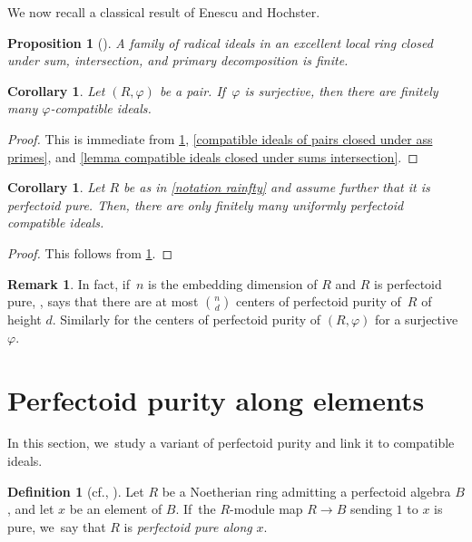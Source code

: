 \documentclass[11pt]{article}
\newcommand{\cf}{cf.\xspace}
\let\autoref\cref
\theoremstyle{plain}
\newtheorem{corollary}[theorem]{Corollary}
\newtheorem{proposition}[theorem]{Proposition}
\theoremstyle{definition}
\newtheorem{definition}[theorem]{Definition}
\newtheorem{remark}[theorem]{Remark}
\numberwithin{equation}{theorem}
\renewcommand{\phi}{\varphi}
\newcommand{\rphi}{(R,\phi)}
\begin{document}
We now recall a classical result of Enescu and Hochster.

\begin{proposition}[{\cite[Cor.\,3.2]{EnescuHochsterTheFrobeniusStructureOfLocalCohomology}}]\label{finiteness result enescu hochster}
A family of radical ideals in an excellent local ring closed under sum,
intersection, and primary decomposition is finite.
\end{proposition}

\begin{corollary}\label{finiteness of phi compatible ideals}
Let $\rphi$ be a pair. If~$\phi$ is surjective, then there are finitely many $\phi$-compatible ideals.
\end{corollary}

\begin{proof}
This is immediate from \autoref{finiteness result enescu hochster}, \autoref{compatible ideals of pairs closed under ass primes}, and \autoref{lemma compatible ideals closed under sums intersection}.
\end{proof}

\begin{corollary}\label{finiteness of uniformly compatible ideals}
Let $R$ be as in \autoref{notation rainfty} and assume further that it is perfectoid pure. Then, there are only finitely many uniformly perfectoid compatible ideals.
\end{corollary}

\begin{proof}
This follows from \autoref{finiteness of phi compatible ideals}.
\end{proof}
\begin{remark}\label{remark bound number cpps}
In fact, if~$n$ is the embedding dimension of $R$ and $R$ is perfectoid pure, \cite[Th.\,4.2]{SchwedeTuckerNumberOfFSplit}, says that there are at most $\binom{n}{d}$ centers of perfectoid purity of~$R$ of height $d$. Similarly for the centers of perfectoid purity of $\rphi$ for a surjective $\phi$.
\end{remark}

\section{Perfectoid purity along elements}

In this section, we~study a variant of perfectoid purity and link it to compatible ideals.

\begin{definition}[{\cf \cite{RamanathanFrobeniusSplittingSchubert}, \cite{SmithGloballyFRegular}}]
Let $R$ be a Noetherian ring admitting a perfectoid algebra $B$, and let $x$ be an element of $B$. If~the $R$\nobreakdash-module map $R\to B$ sending $1$ to $x$ is pure, we~say that $R$ is \emph{perfectoid pure along} $x$.
\end{definition}
\end{document}
